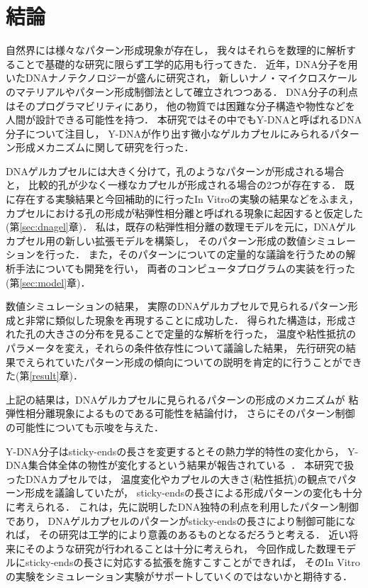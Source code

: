 \chapter{結論}

自然界には様々なパターン形成現象が存在し，
我々はそれらを数理的に解析することで基礎的な研究に限らず工学的応用も行ってきた．
近年，DNA分子を用いたDNAナノテクノロジーが盛んに研究され，
新しいナノ・マイクロスケールのマテリアルやパターン形成制御法として確立されつつある．
DNA分子の利点はそのプログラマビリティにあり，
他の物質では困難な分子構造や物性などを人間が設計できる可能性を持つ．
本研究ではその中でもY-DNAと呼ばれるDNA分子について注目し，
Y-DNAが作り出す微小なゲルカプセルにみられるパターン形成メカニズムに関して研究を行った．

DNAゲルカプセルには大きく分けて，孔のようなパターンが形成される場合と，
比較的孔が少なく一様なカプセルが形成される場合の2つが存在する．
既に存在する実験結果と今回補助的に行ったIn Vitroの実験の結果などをふまえ，
カプセルにおける孔の形成が粘弾性相分離と呼ばれる現象に起因すると仮定した(第\ref{sec:dnagel}章)．
私は，既存の粘弾性相分離の数理モデルを元に，DNAゲルカプセル用の新しい拡張モデルを構築し，
そのパターン形成の数値シミュレーションを行った．
また，そのパターンについての定量的な議論を行うための解析手法についても開発を行い，
両者のコンピュータプログラムの実装を行った(第\ref{sec:model}章)．

数値シミュレーションの結果，
実際のDNAゲルカプセルで見られるパターン形成と非常に類似した現象を再現することに成功した．
得られた構造は，形成された孔の大きさの分布を見ることで定量的な解析を行った，
温度や粘性抵抗のパラメータを変え，それらの条件依存性について議論した結果，
先行研究の結果でえられていたパターン形成の傾向についての説明を肯定的に行うことができた(第\ref{result}章)．

上記の結果は，DNAゲルカプセルに見られるパターンの形成のメカニズムが
粘弾性相分離現象によるものである可能性を結論付け，
さらにそのパターン制御の可能性についても示唆を与えた．

Y-DNA分子はsticky-endsの長さを変更するとその熱力学的特性の変化から，
Y-DNA集合体全体の物性が変化するという結果が報告されている~\cite{sato2019sequence}．
本研究で扱ったDNAカプセルでは，
温度変化やカプセルの大きさ(粘性抵抗)の観点でパターン形成を議論していたが，
sticky-endsの長さによる形成パターンの変化も十分に考えられる．
これは，先に説明したDNA独特の利点を利用したパターン制御であり，
DNAゲルカプセルのパターンがsticky-endsの長さにより制御可能になれば，
その研究は工学的により意義のあるものとなるだろうと考える．
近い将来にそのような研究が行われることは十分に考えられ，
今回作成した数理モデルにsticky-endsの長さに対応する拡張を施すこすことができれば，
そのIn Vitroの実験をシミュレーション実験がサポートしていくのではないかと期待する．
